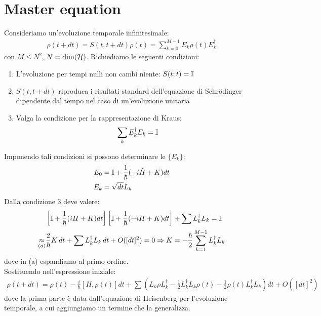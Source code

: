 \documentclass[../../InformazioneQuantistica.tex]{subfiles}
\begin{document}
\section{Master equation}
Consideriamo un'evoluzione temporale infinitesimale:
\begin{align*}
\rho(t+dt) = S(t,t+dt) \rho(t) = \sum_{k=0}^{M-1} E_k \rho(t) E_k^\dag
\end{align*}
con $M \leq N^2$, $N=\operatorname{dim}(\mathcal{H})$. Richiediamo le seguenti condizioni:
\begin{enumerate}
\item L'evoluzione per tempi nulli non cambi niente: $S(t;t) = \mathbb{I}$
\item $S(t,t+dt)$ riproduca i risultati standard dell'equazione di Schr\"odinger dipendente dal tempo nel caso di un'evoluzione unitaria
\item Valga la condizione per la rappresentazione di Kraus:
\begin{align*}
\sum_k E_k^\dag E_k = \mathbb{I}
\end{align*}
\end{enumerate}

Imponendo tali condizioni si possono determinare le $\{E_k\}$:
\begin{align*}
E_0 &= \mathbb{I} + \frac{1}{\hbar}(-i\hat{H}+K)dt\\
E_k &= \sqrt{dt} L_k
\end{align*}
Dalla condizione $3$ deve valere:
\begin{align*}
&\left[\mathbb{I}+\frac{1}{\hbar}(iH+K)dt \right]\left[\mathbb{I}+\frac{1}{\hbar}(-iH+K)dt\right]+\sum L_k^\dag L_k = \mathbb{I}\\
\underset{(a)}{\approx} & \frac{2}{\hbar}K\,dt + \sum L_k^\dag L_k\,dt + O([dt]^2) = 0 \Rightarrow K = -\frac{\hbar}{2} \sum_{k=1}^{M-1}L_k^\dag L_k 
\end{align*}
dove in (a) espandiamo al primo ordine.\\

Sostituendo nell'espressione iniziale:
\begin{align*}
\rho(t+dt)=\rho(t) - \frac{i}{\hbar}[H,\rho(t)]dt + \sum \left( L_k \rho L_k^\dag - \frac{1}{2}L_k^\dag L_k\rho(t) - \frac{1}{2}\rho(t) L_k^\dag L_k \right)dt + O([dt]^2)
\end{align*}
dove la prima parte è data dall'equazione di Heisenberg per l'evoluzione temporale, a cui aggiungiamo un termine che la generalizza.\\
\end{document}
